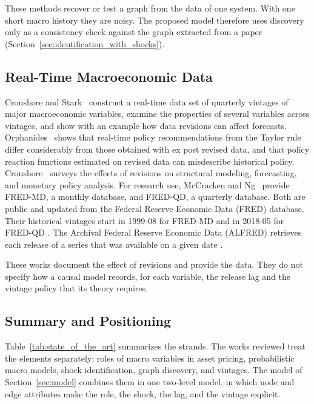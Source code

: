   These methods recover or test a graph from the data of one system. With one
  short macro history they are noisy. The proposed model therefore uses
  discovery only as a consistency check against the graph extracted from a
  paper (Section~\ref{sec:identification_with_shocks}).

  \subsection{Real-Time Macroeconomic Data}\label{sec:sota_real_time}

  Croushore and Stark~\cite{croushore2001real} construct a real-time data set of quarterly vintages
  of major macroeconomic variables, examine the properties of several variables
  across vintages, and show with an example how data revisions can affect
  forecasts. Orphanides~\cite{orphanides2001monetary} shows that real-time policy
  recommendations from the Taylor rule differ considerably from those obtained
  with ex post revised data, and that policy reaction functions estimated on
  revised data can misdescribe historical policy. Croushore~\cite{croushore2011frontiers}
  surveys the effects of revisions on structural modeling, forecasting, and
  monetary policy analysis. For research use, McCracken and Ng~\cite{mccracken2016fredmd,mccracken2021fredqd}
  provide FRED-MD, a monthly database, and FRED-QD, a
  quarterly database. Both are public and updated from the Federal Reserve
  Economic Data (FRED) database. Their historical vintages start in 1999-08 for
  FRED-MD and in 2018-05 for FRED-QD \cite{fredmddb}. The Archival Federal
  Reserve Economic Data (ALFRED) retrieves each release of a series that was
  available on a given date \cite{alfred}.

  These works document the effect of revisions and provide the data. They do
  not specify how a causal model records, for each variable, the release lag
  and the vintage policy that its theory requires.

  \subsection{Summary and Positioning}\label{sec:sota_summary}

  Table~\ref{tab:state_of_the_art} summarizes the strands. The works reviewed
  treat the elements separately: roles of macro variables in asset pricing,
  probabilistic macro models, shock identification, graph discovery, and
  vintages. The model of Section~\ref{sec:model} combines them in one two-level
  model, in which node and edge attributes make the role, the shock, the lag,
  and the vintage explicit.

